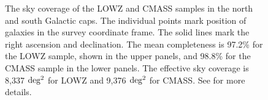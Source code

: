 \documentclass[iop]{emulateapj}
\begin{document}
\begin{figure}
   \caption{\label{fig_radec}
   The sky coverage of the LOWZ and CMASS samples in the north and south Galactic caps. 
   The individual points mark position of galaxies in the survey coordinate frame.
   The solid lines mark the right ascension and declination.
   The mean completeness is 97.2\% for the LOWZ sample, shown in the upper panels,
   and 98.8\% for the CMASS sample in the lower panels.
   The effective sky coverage is 8,337 $\rm deg^2$ for LOWZ and 9,376 $\rm deg^2$ for CMASS.
   See \cite{Reidetal:2016} for more details.
   }
\end{figure}
\end{document}
